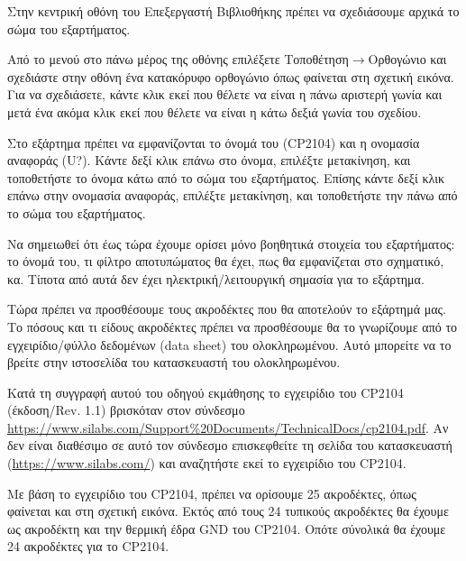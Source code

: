 \documentclass[a4paper]{article}
\begin{document}
Στην κεντρική οθόνη του Επεξεργαστή Βιβλιοθήκης πρέπει να σχεδιάσουμε αρχικά το σώμα του εξαρτήματος. 

Από το μενού στο πάνω μέρος της οθόνης επιλέξετε Τοποθέτηση$\rightarrow$Ορθογώνιο και σχεδιάστε στην οθόνη ένα κατακόρυφο ορθογώνιο όπως φαίνεται στη σχετική εικόνα. Για να σχεδιάσετε, κάντε κλικ εκεί που θέλετε να είναι η πάνω αριστερή γωνία και μετά ένα ακόμα κλικ εκεί που θέλετε να είναι η κάτω δεξιά γωνία του σχεδίου.

Στο εξάρτημα πρέπει να εμφανίζονται το όνομά του (CP2104) και η ονομασία αναφοράς (U?). Κάντε δεξί κλικ επάνω στο όνομα, επιλέξτε μετακίνηση, και τοποθετήστε το όνομα κάτω από το σώμα του εξαρτήματος. Επίσης κάντε δεξί κλικ επάνω στην ονομασία αναφοράς, επιλέξτε μετακίνηση, και τοποθετήστε την πάνω από το σώμα του εξαρτήματος. 

\begin{figure}
  \begin{center}
    \label{fig:kicad-main}
  \end{center}
\end{figure}

Να σημειωθεί ότι έως τώρα έχουμε ορίσει μόνο βοηθητικά στοιχεία του εξαρτήματος: το όνομά του, τι φίλτρο αποτυπώματος θα έχει, πως θα εμφανίζεται στο σχηματικό, κα. Τίποτα από αυτά δεν έχει ηλεκτρική/λειτουργική σημασία για το εξάρτημα.

Τώρα πρέπει να προσθέσουμε τους ακροδέκτες που θα αποτελούν το εξάρτημά μας. Το πόσους και τι είδους ακροδέκτες πρέπει να προσθέσουμε θα το γνωρίζουμε από το εγχειρίδιο/φύλλο δεδομένων (data sheet) του ολοκληρωμένου. Αυτό μπορείτε να το βρείτε στην ιστοσελίδα του κατασκευαστή του ολοκληρωμένου. 

Κατά τη συγγραφή αυτού του οδηγού εκμάθησης το εγχειρίδιο του CP2104 (έκδοση/Rev. 1.1) βρισκόταν στον σύνδεσμο \href{https://www.silabs.com/Support\%20Documents/TechnicalDocs/cp2104.pdf}{https://www.silabs.com/Support\%20Documents/TechnicalDocs/cp2104.pdf}. Αν δεν είναι διαθέσιμο σε αυτό τον σύνδεσμο επισκεφθείτε τη σελίδα του κατασκευαστή (\href{https://www.silabs.com/}{https://www.silabs.com/}) και αναζητήστε εκεί το εγχειρίδιο του CP2104.

Με βάση το εγχειρίδιο του CP2104, πρέπει να ορίσουμε 25 ακροδέκτες, όπως φαίνεται και στη σχετική εικόνα. Εκτός από τους 24 τυπικούς ακροδέκτες θα έχουμε ως ακροδέκτη και την θερμική έδρα GND του CP2104. Οπότε σύνολικά θα έχουμε 24 ακροδέκτες για το CP2104.
\end{document}
